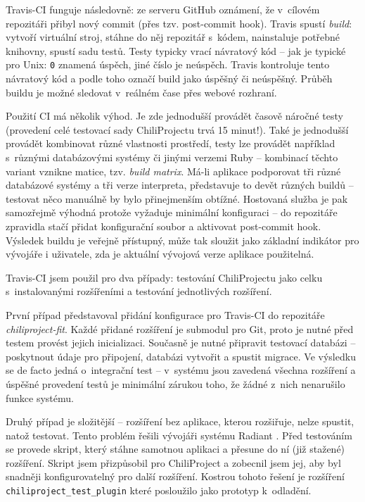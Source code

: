 \documentclass[thesis=B,czech]{FITthesis}[2012/05/02]
\begin{document}
Travis-CI funguje následovně: ze serveru GitHub oznámení, že v~cílovém
repozitáři přibyl nový \gls{commit} (přes tzv. post-commit hook). Travis
spustí \emph{build}: vytvoří virtuální stroj, stáhne do něj repozitář
s~kódem, nainstaluje potřebné knihovny, spustí sadu testů. Testy typicky
vrací návratový kód -- jak je typické pro Unix: \lstinline!0! znamená
úspěch, jiné číslo je neúspěch. Travis kontroluje tento návratový kód a
podle toho označí build jako úspěšný či neúspěšný. Průběh buildu je
možné sledovat v~reálném čase přes webové rozhraní.

Použití \gls{CI} má několik výhod. Je zde jednodušší provádět časově
náročné testy (provedení celé testovací sady ChiliProjectu trvá 15
minut!). Také je jednodušší provádět kombinovat různé vlastnosti
prostředí, testy lze provádět například s~různými databázovými systémy
či jinými verzemi Ruby -- kombinací těchto variant vznikne matice, tzv.
\emph{build matrix}. Má-li aplikace podporovat tři různé databázové systémy
a tři verze interpreta, představuje to devět různých buildů -- testovat
něco manuálně by bylo přinejmenším obtížné. Hostovaná služba je pak
samozřejmě výhodná protože vyžaduje minimální konfiguraci -- do
repozitáře zpravidla stačí přidat konfigurační soubor a aktivovat
post-commit hook. Výsledek buildu je veřejně přístupný, může tak sloužit
jako základní indikátor pro vývojáře i uživatele, zda je aktuální
vývojová verze aplikace použitelná.

Travis-CI jsem použil pro dva případy: testování ChiliProjectu jako
celku s~instalovanými rozšířeními a testování jednotlivých
rozšíření.

První případ představoval přidání konfigurace pro Travis-CI do
repozitáře \emph{chiliproject-fit}. Každé přidané rozšíření je
\gls{submodul} pro Git, proto je nutné před testem provést jejich
inicializaci. Současně je nutné připravit testovací databázi --
poskytnout údaje pro připojení, databázi vytvořit a spustit migrace. Ve
výsledku se de facto jedná o~integrační test -- v~systému jsou zavedená
všechna rozšíření a úspěšné provedení testů je minimální zárukou toho,
že žádné z~nich nenarušilo funkce systému.

Druhý případ je složitější -- rozšíření bez aplikace, kterou rozšiřuje,
nelze spustit, natož testovat. Tento problém řešili vývojáři systému
Radiant \citep{Muhl2012}. Před testováním se provede skript, který
stáhne samotnou aplikaci a přesune do ní (již stažené) rozšíření. Skript
jsem přizpůsobil pro ChiliProject a zobecnil jsem jej, aby byl snadněji
konfigurovatelný pro další rozšíření. Kostrou tohoto řešení je rozšíření
\lstinline!chiliproject_test_plugin! které posloužilo jako prototyp
k~odladění.
\end{document}
